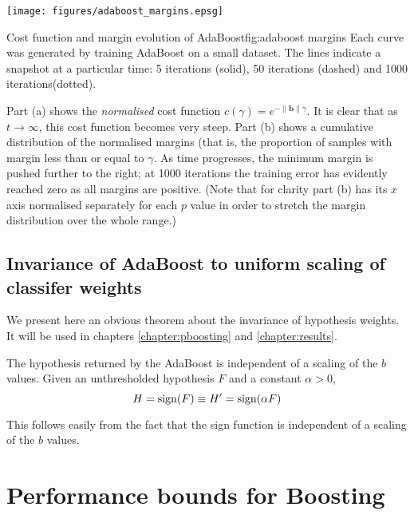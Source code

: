 \begin{linefigure}
\begin{center}
\texttt{[image: figures/adaboost\_margins.epsg]}
\end{center}
\begin{capt}{Cost function and margin evolution of
AdaBoost}{fig:adaboost margins}
Each curve was generated by training AdaBoost on a small dataset.  The
lines indicate a snapshot at a particular time: 5 iterations (solid),
50 iterations (dashed) and 1000 iterations(dotted).

Part (a) shows the \emph{normalised} cost function $c(\gamma) =
e^{-\|\mathbf{b}\| \gamma}$.  It is clear that as $t \rightarrow \infty$,
this cost function becomes very steep.  Part (b) shows a cumulative
distribution of the normalised margins (that is, the proportion of
samples with margin less than or equal to $\gamma$.  As time
progresses, the minimum margin is pushed further to the right; at 1000
iterations the training error has evidently reached zero as all
margins are positive.  (Note that for clarity part (b) has its $x$
axis normalised separately for each $p$ value in order to stretch the
margin distribution over the whole range.)
\end{capt}
\end{linefigure}


\subsection{Invariance of AdaBoost to uniform scaling of classifer
weights}

We present here an obvious theorem about the invariance of hypothesis
weights.  It will be used in chapters \ref{chapter:pboosting} and
\ref{chapter:results}.

\begin{theorem}
The hypothesis returned by the AdaBoost is independent of a 
scaling of the $b$ values.  Given an unthresholded hypothesis $F$ and
a constant $\alpha > 0$,
%
\begin{equation}
H = \mathrm{sign}(F) \equiv H' = \mathrm{sign}(\alpha F) 
\end{equation}
\end{theorem}

\proof This follows easily from the fact that the sign function is
independent of a scaling of the $b$ values.



\section{Performance bounds for Boosting}

